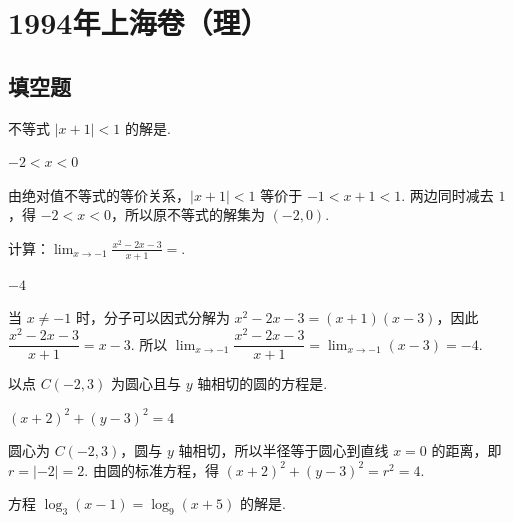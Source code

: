 \chapter{1994年上海卷（理）}
\section{填空题}

\begin{problem}
不等式 \(|x + 1| < 1\) 的解是\fillinblank{}.
\end{problem}

\begin{answer}
\(-2 < x < 0\)
\end{answer}

\begin{solution}
由绝对值不等式的等价关系，\(|x+1|<1\) 等价于 \(-1<x+1<1\). 两边同时减去 \(1\)，得 \(-2<x<0\)，所以原不等式的解集为 \((-2,0)\).
\end{solution}

\begin{problem}
计算：\(\displaystyle\lim_{x \to -1}\frac{x^{2} - 2x - 3}{x + 1} =\)\fillinblank{}.
\end{problem}

\begin{answer}
\(-4\)
\end{answer}

\begin{solution}
当 \(x\ne-1\) 时，分子可以因式分解为 \(x^2-2x-3=(x+1)(x-3)\)，因此
\(\dfrac{x^2-2x-3}{x+1}=x-3\). 所以
\(\displaystyle\lim_{x\to-1}\dfrac{x^2-2x-3}{x+1}=\lim_{x\to-1}(x-3)=-4\).
\end{solution}

\begin{problem}
以点 \(C(-2,3)\) 为圆心且与 \(y\) 轴相切的圆的方程是\fillinblank{}.
\end{problem}

\begin{answer}
\((x + 2)^2 + (y - 3)^2 = 4\)
\end{answer}

\begin{solution}
圆心为 \(C(-2,3)\)，圆与 \(y\) 轴相切，所以半径等于圆心到直线 \(x=0\) 的距离，即 \(r=|-2|=2\). 由圆的标准方程，得
\((x+2)^2+(y-3)^2=r^2=4\).
\end{solution}

\begin{problem}
方程 \(\log_3(x - 1) = \log_9(x + 5)\) 的解是\fillinblank{}.
\end{problem}

